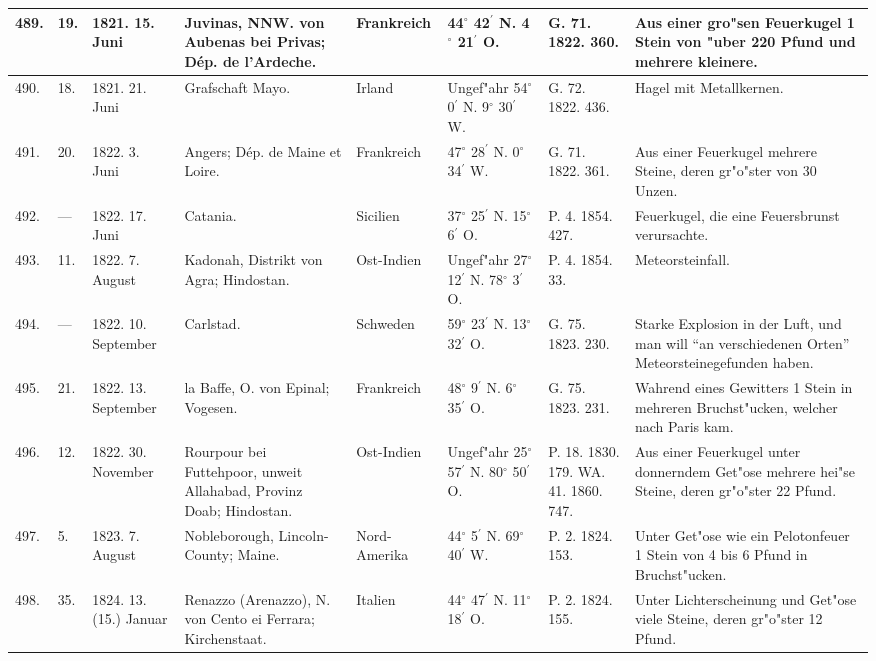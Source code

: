 \documentclass[a4paper, 8pt, oneside, polutonikogreek, german]{article}
\begin{document}
\begin{center}
\begin{longtable}{| p{5mm} | p{3mm} | p{15mm} | p{25mm} | p{20mm} | p{14mm} | p{17mm} | p{24mm} |}
        489. & 19. & 1821. 15. Juni & Juvinas, NNW. von Aubenas bei Privas; Dép. de l’Ardeche. & Frankreich & 44$^\circ$ 42$^\prime$ N. 4$^\circ$ 21$^\prime$ O. & G. 71. 1822. 360. & Aus einer gro"sen Feuerkugel 1 Stein von "uber 220 Pfund und mehrere kleinere. \\ \hline
        490. & 18. & 1821. 21. Juni & Grafschaft Mayo. & Irland & Ungef"ahr 54$^\circ$ 0$^\prime$ N. 9$^\circ$ 30$^\prime$ W. & G. 72. 1822. 436. & Hagel mit Metallkernen. \\ \hline
        491. & 20. & 1822. 3. Juni & Angers; Dép. de Maine et Loire. & Frankreich & 47$^\circ$ 28$^\prime$ N. 0$^\circ$ 34$^\prime$ W. & G. 71. 1822. 361. & Aus einer Feuerkugel mehrere Steine, deren gr"o"ster von 30 Unzen. \\ \hline
        492. & --- & 1822. 17. Juni & Catania. & Sicilien & 37$^\circ$ 25$^\prime$ N. 15$^\circ$ 6$^\prime$ O. & P. 4. 1854. 427. & Feuerkugel, die eine Feuersbrunst verursachte. \\ \hline
        493. & 11. & 1822. 7. August & Kadonah, Distrikt von Agra; Hindostan. & Ost-Indien & Ungef"ahr 27$^\circ$ 12$^\prime$ N. 78$^\circ$ 3$^\prime$ O. & P. 4. 1854. 33. & Meteorsteinfall. \\ \hline
        494. & --- & 1822. 10. September & Carlstad. & Schweden & 59$^\circ$ 23$^\prime$ N. 13$^\circ$ 32$^\prime$ O. & G. 75. 1823. 230. & Starke Explosion in der Luft, und man will "`an verschiedenen Orten"' Meteorsteinegefunden haben. \\ \hline
        495. & 21. & 1822. 13. September & la Baffe, O. von Epinal; Vogesen. & Frankreich & 48$^\circ$ 9$^\prime$ N. 6$^\circ$ 35$^\prime$ O. & G. 75. 1823. 231. & Wahrend eines Gewitters 1 Stein in mehreren Bruchst"ucken, welcher nach Paris kam. \\ \hline
        496. & 12. & 1822. 30. November & Rourpour bei Futtehpoor, unweit Allahabad, Provinz Doab; Hindostan. & Ost-Indien & Ungef"ahr 25$^\circ$ 57$^\prime$ N. 80$^\circ$ 50$^\prime$ O. & P. 18. 1830. 179. WA. 41. 1860. 747. & Aus einer Feuerkugel unter donnerndem Get"ose mehrere hei"se Steine, deren gr"o"ster 22 Pfund. \\ \hline
        497. & 5. & 1823. 7. August & Nobleborough, Lincoln-County; Maine. & Nord-Amerika & 44$^\circ$ 5$^\prime$ N. 69$^\circ$ 40$^\prime$ W. & P. 2. 1824. 153. & Unter Get"ose wie ein Pelotonfeuer 1 Stein von 4 bis 6 Pfund in Bruchst"ucken. \\ \hline
        498. & 35. & 1824. 13. (15.) Januar & Renazzo (Arenazzo), N. von Cento ei Ferrara; Kirchenstaat. & Italien & 44$^\circ$ 47$^\prime$ N. 11$^\circ$ 18$^\prime$ O. & P. 2. 1824. 155. & Unter Lichterscheinung und Get"ose viele Steine, deren gr"o"ster 12 Pfund. \\ \hline

\end{longtable}
\end{center}
\end{document}

